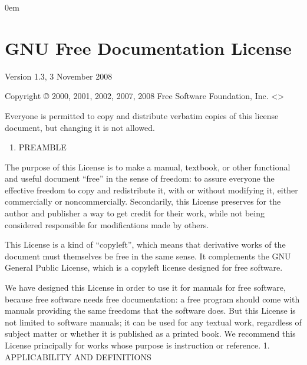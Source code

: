 \documentclass[letterpaper,10pt,english]{sphinxmanual}
\begin{document}
\begin{DUlineblock}{0em}
\item[] 
\item[] 
\end{DUlineblock}

\ignorespaces 

\section{GNU Free Documentation License}
\label{\detokenize{licensing:gnu-free-documentation-license}}\label{\detokenize{licensing:index-2}}
\sphinxAtStartPar
{}

\sphinxAtStartPar
Version 1.3, 3 November 2008

\sphinxAtStartPar
Copyright © 2000, 2001, 2002, 2007, 2008 Free Software Foundation, Inc. \textless{}\textgreater{}

\sphinxAtStartPar
Everyone is permitted to copy and distribute verbatim copies of this license document, but changing it is not allowed.
\begin{enumerate}
%
\setcounter{enumi}{-1}
\item {} 
\sphinxAtStartPar
PREAMBLE

\end{enumerate}

\sphinxAtStartPar
The purpose of this License is to make a manual, textbook, or other functional and useful document “free” in the sense of freedom: to assure everyone the effective freedom to copy and redistribute it, with or without modifying it, either commercially or noncommercially. Secondarily, this License preserves for the author and publisher a way to get credit for their work, while not being considered responsible for modifications made by others.

\sphinxAtStartPar
This License is a kind of “copyleft”, which means that derivative works of the document must themselves be free in the same sense. It complements the GNU General Public License, which is a copyleft license designed for free software.

\sphinxAtStartPar
We have designed this License in order to use it for manuals for free software, because free software needs free documentation: a free program should come with manuals providing the same freedoms that the software does. But this License is not limited to software manuals; it can be used for any textual work, regardless of subject matter or whether it is published as a printed book. We recommend this License principally for works whose purpose is instruction or reference.
1. APPLICABILITY AND DEFINITIONS
\end{document}

